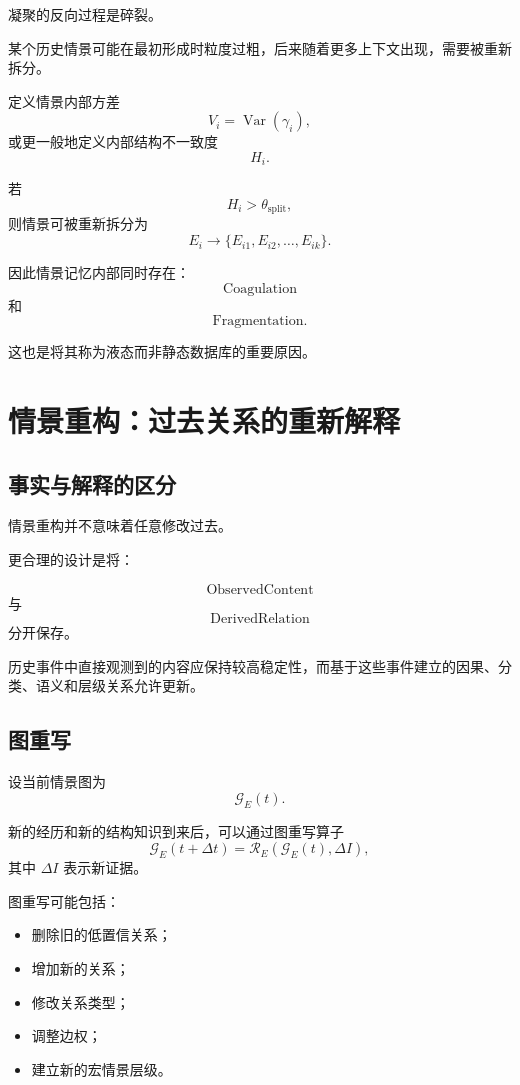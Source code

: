 凝聚的反向过程是碎裂。

某个历史情景可能在最初形成时粒度过粗，后来随着更多上下文出现，需要被重新拆分。

定义情景内部方差
\[
V_i
=
\operatorname{Var}(\gamma_i),
\]
或更一般地定义内部结构不一致度
\[
H_i.
\]

若
\[
H_i>\theta_{\mathrm{split}},
\]
则情景可被重新拆分为
\[
\boxed{
E_i
\rightarrow
\{E_{i1},E_{i2},\ldots,E_{ik}\}.
}
\]

因此情景记忆内部同时存在：
\[
\boxed{
\mathrm{Coagulation}
}
\]
和
\[
\boxed{
\mathrm{Fragmentation}.
}
\]

这也是将其称为液态而非静态数据库的重要原因。

\section{情景重构：过去关系的重新解释}

\subsection{事实与解释的区分}

情景重构并不意味着任意修改过去。

更合理的设计是将：

\[
\mathrm{ObservedContent}
\]
与
\[
\mathrm{DerivedRelation}
\]
分开保存。

历史事件中直接观测到的内容应保持较高稳定性，而基于这些事件建立的因果、分类、语义和层级关系允许更新。

\subsection{图重写}

设当前情景图为
\[
\mathcal{G}_E(t).
\]

新的经历和新的结构知识到来后，可以通过图重写算子
\[
\boxed{
\mathcal{G}_E(t+\Delta t)
=
\mathcal{R}_E
\left(
\mathcal{G}_E(t),
\Delta I
\right),
}
\]
其中 $\Delta I$ 表示新证据。

图重写可能包括：

\begin{itemize}
    \item 删除旧的低置信关系；
    \item 增加新的关系；
    \item 修改关系类型；
    \item 调整边权；
    \item 建立新的宏情景层级。
\end{itemize}

